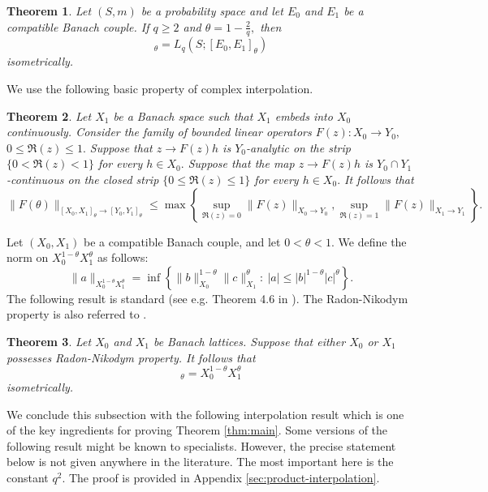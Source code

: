 \documentclass{amsart}
\numberwithin{equation}{section}
\newtheorem{thm}{Theorem}[section]
\theoremstyle{definition}
\theoremstyle{remark}
\newcommand{\1}{\mathbf 1}
\begin{document}
\begin{thm}\label{thm:bochner}
Let $(S,m)$ be a probability space and let $E_{0}$ and $E_{1}$ be a compatible Banach couple. If $q\geq 2$ and $\theta=1-\frac{2}{q},$ then
\begin{equation*}
 [L_{2}(S;E_{0}),L_{\infty}(S;E_{1})]_{\theta}
 =L_q(S;[E_{0},E_{1}]_{\theta})
\end{equation*}
isometrically.
\end{thm}

We use the following basic property of complex interpolation.

\begin{thm}\label{standard complex interpolation theorem}
Let $X_1$ be a Banach space such that $X_{1}$ embeds into $X_{0}$ continuously. Consider the family of bounded linear operators $F(z):X_0\to Y_0,$ $0\leq\Re(z)\leq 1.$ Suppose that $z\to F(z)h$ is $Y_0$-analytic on the strip $\{0<\Re(z)<1\}$ for every $h\in X_0.$ Suppose that the map $z\to F(z)h$ is $Y_0\cap Y_1$-continuous on the closed strip $\{0\leq\Re(z)\leq 1\}$ for every $h\in X_0.$ It follows that
$$
\|F(\theta)\|_{[X_0,X_1]_{\theta}\to [Y_0,Y_1]_{\theta}}\leq\max\left\{\sup_{\Re(z)=0}\|F(z)\|_{X_0\to Y_0},\sup_{\Re(z)=1}\|F(z)\|_{X_1\to Y_1}\right\}.
$$
\end{thm}
\noindent 
Let \((X_0,X_1)\) be a compatible Banach couple, and let \(0<\theta<1\). We define the norm on \(X_0^{1-\theta}X_1^\theta\) as follows:
\begin{equation*}
\|a\|_{X_0^{1-\theta}X_1^{\theta}}=\inf\left\{\|b\|_{X_0}^{1-\theta}\|c\|_{X_1}^{\theta}:\ |a|\leq |b|^{1-\theta}|c|^{\theta}\right\}.
\end{equation*}
The following result is standard (see e.g. Theorem 4.6 in \cite{Kalton-MS}). The Radon-Nikodym property is also referred to \cite{Kalton-MS}. 

\begin{thm}\label{lem:lattice}
Let $X_0$ and $X_1$ be Banach lattices. Suppose that either $X_0$ or $X_1$ possesses Radon-Nikodym property. It follows that
\begin{equation*}
 [X_0,X_1]_{\theta}=X_0^{1-\theta}X_1^{\theta}
\end{equation*}
isometrically.
\end{thm}

We conclude this subsection with the following interpolation result which is one of the key ingredients for proving Theorem \ref{thm:main}. Some versions of the following result might be known to specialists. However, the precise statement below is not given anywhere in the literature. The most important here is the constant $q^2.$ The proof is provided in Appendix \ref{sec:product-interpolation}. 
\end{document}
